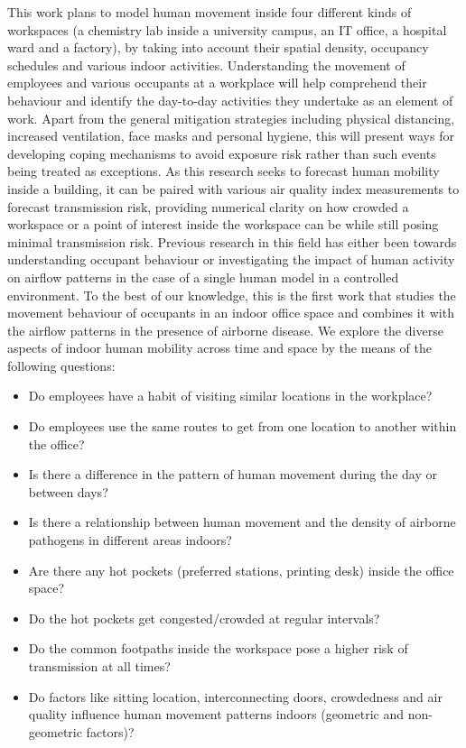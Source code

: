 \documentclass[acmtog]{acmart}
\begin{document}
This work plans to model human movement inside four different kinds of workspaces (a chemistry lab inside a university campus, an IT office, a hospital ward and a factory), by taking into account their spatial density, occupancy schedules and various indoor activities. Understanding the movement of employees and various occupants at a workplace will help comprehend their behaviour and identify the day-to-day activities they undertake as an element of work. Apart from the general mitigation strategies including physical distancing, increased ventilation, face masks and personal hygiene, this will present ways for developing coping mechanisms to avoid exposure risk rather than such events being treated as exceptions. As this research seeks to forecast human mobility inside a building, it can be paired with various air quality index measurements to forecast transmission risk, providing numerical clarity on how crowded a workspace or a point of interest inside the workspace can be while still posing minimal transmission risk. Previous research in this field has either been towards understanding occupant behaviour or investigating the impact of human activity on airflow patterns in the case of a single human model in a controlled environment. To the best of our knowledge, this is the first work that studies the movement behaviour of occupants in an indoor office space and combines it with the airflow patterns in the presence of airborne disease. We explore the diverse aspects of indoor human mobility across time and space by the means of the following questions:
\begin{itemize}
    \item Do employees have a habit of visiting similar locations in the workplace?
    \item Do employees use the same routes to get from one location to another within the office?
    \item Is there a difference in the pattern of human movement during the day or between days?
    \item Is there a relationship between human movement and the density of airborne pathogens in different areas indoors?
    \item Are there any hot pockets (preferred stations, printing desk) inside the office space?
    \item Do the hot pockets get congested/crowded at regular intervals?
    \item Do the common footpaths inside the workspace pose a higher risk of transmission at all times?
    \item Do factors like sitting location, interconnecting doors, crowdedness and air quality influence human movement patterns indoors (geometric and non-geometric factors)?
\end{itemize}
\end{document}
